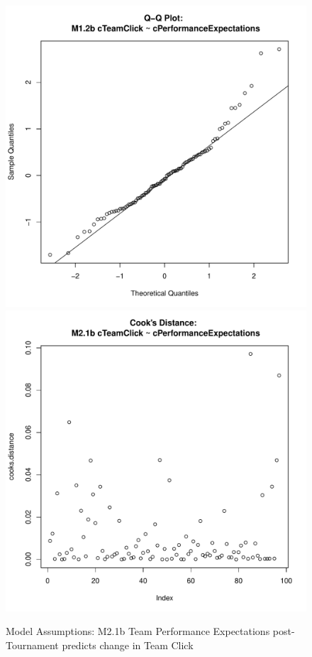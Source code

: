 {\begin{figure}[htbp]
  \includegraphics[scale =.4]{images/MLM21bQQNorm.pdf}
  \includegraphics[scale =.4]{images/MLM21bCooksD.pdf}
  \caption{Model Assumptions: M2.1b Team Performance Expectations post-Tournament predicts change in Team Click}
  \label{fig:MLM21bAssumptions}
\end{figure}


}

